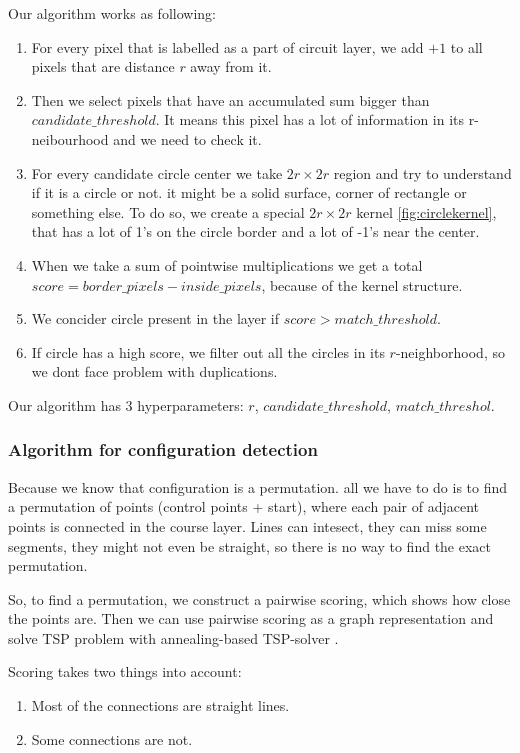 \documentclass[a4paper,12pt]{extarticle}
\begin{document}
Our algorithm works as following:
\begin{enumerate}
    \item For every pixel that is labelled as a part of circuit layer, we add $+1$ to all pixels that are distance $r$ away from it.
    \item Then we select pixels that have an accumulated sum bigger than $candidate\_threshold$. It means this pixel has a lot of information in its r-neibourhood and we need to check it.
    \item For every candidate circle center we take $2r \times 2r$ region and try to understand if it is a circle or not. it might be a solid surface, corner of rectangle or something else. To do so, we create a special $2r \times 2r$ kernel \cref{fig:circlekernel}, that has a lot of 1's on the circle border and a lot of -1's near the center.
    \item When we take a sum of pointwise multiplications we get a total $score = border\_pixels - inside\_pixels$, because of the kernel structure.
    \item We concider circle present in the layer if $score > match\_threshold$.
    \item If circle has a high score, we filter out all the circles in its $r$-neighborhood, so we dont face problem with duplications. 
\end{enumerate}

Our algorithm has 3 hyperparameters: $r$, $candidate\_threshold$, $match\_threshol$.

\subsubsection{Algorithm for configuration detection}

Because we know that configuration is a permutation. all we have to do is to find a permutation of points (control points + start), where each pair of adjacent points is connected in the course layer.
Lines can intesect, they can miss some segments, they might not even be straight, so there is no way to find the exact permutation.

So, to find a permutation, we construct a pairwise scoring, which shows how close the points are.
Then we can use pairwise scoring as a graph representation and solve TSP problem \cite{tsp} with annealing-based TSP-solver \cite{tspsolver}.

Scoring takes two things into account:
\begin{enumerate}
    \item Most of the connections are straight lines.
    \item Some connections are not.
\end{enumerate}
\end{document}
